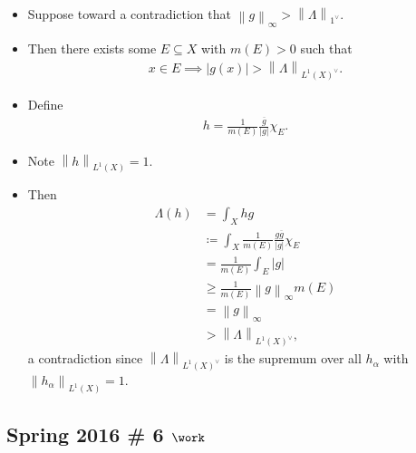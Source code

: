 \begin{solution}
\begin{itemize}
\begin{itemize}
    \begin{itemize}
    \item
      Suppose toward a contradiction that
      \({\left\lVert {g} \right\rVert}_\infty > {\left\lVert {\Lambda} \right\rVert}_{1^\vee}\).
    \item
      Then there exists some \(E\subseteq X\) with \(m(E) > 0\) such
      that
      \begin{align*}x\in E \implies {\left\lvert {g(x)} \right\rvert} > {\left\lVert {\Lambda} \right\rVert}_{L^1(X)^\vee}.\end{align*}
    \item
      Define
      \begin{align*}
      h = \frac{1}{m(E)} \frac{\overline{g}}{{\left\lvert {g} \right\rvert}} \chi_E
      .\end{align*}
    \item
      Note \({\left\lVert {h} \right\rVert}_{L^1(X)} = 1\).
    \item
      Then
      \begin{align*}
      \Lambda(h) &= \int_X hg \\
      &\coloneqq\int_X \frac{1}{m(E)} \frac{g \overline g}{{\left\lvert {g} \right\rvert}} \chi_E \\
      &= \frac{1}{m(E)} \int_E {\left\lvert {g} \right\rvert} \\
      &\geq \frac{1}{m(E)} {\left\lVert {g} \right\rVert}_\infty m(E) \\
      &= {\left\lVert {g} \right\rVert}_\infty \\
      &> {\left\lVert {\Lambda} \right\rVert}_{L^1(X)^\vee}
      ,\end{align*}
      a contradiction since
      \({\left\lVert {\Lambda} \right\rVert}_{L^1(X)^\vee}\) is the
      supremum over all \(h_\alpha\) with
      \({\left\lVert {h_\alpha} \right\rVert}_{L^1(X)} = 1\).
    \end{itemize}
  \end{itemize}
\end{itemize}

\end{solution}

\hypertarget{spring-2016-6-work}{%
\subsection{\texorpdfstring{Spring 2016 \# 6
\(\work\)}{Spring 2016 \# 6 \textbackslash work}}\label{spring-2016-6-work}}

